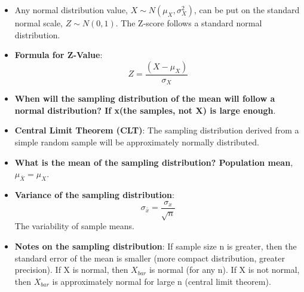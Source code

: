 \documentclass[12pt]{article}
\begin{document}
\begin{itemize}
\item Any normal distribution value, \textbf{$X \sim N(\mu_X , \sigma^2_X)$}, can be put on the standard normal scale, \textbf{$Z \sim N(0, 1)$}. The Z-score follows a standard normal distribution.
\item \textbf{Formula for Z-Value}: $$Z = \frac{(X - \mu_X)}{\sigma_X}$$
\item \textbf{When will the sampling distribution of the mean will follow a normal distribution? If x(the samples, not X) is large enough}.
\item \textbf{Central Limit Theorem (CLT)}: The sampling distribution derived from a simple random sample will be approximately normally distributed.
\item \textbf{What is the mean of the sampling distribution? Population mean}, \textbf{$\mu_{\bar{X}} = \mu_X$}.
\item \textbf{Variance of the sampling distribution}: $$\sigma_{\bar{x}} = \frac{\sigma_x}{\sqrt{n}}$$
The variability of sample means.
\item \textbf{Notes on the sampling distribution}: If sample size n is greater, then the standard error of the mean is smaller (more compact distribution, greater precision). If X is normal, then $X_{bar}$ is normal (for any n). If X is not normal, then $X_{bar}$ is approximately normal for large n (central limit theorem).
\end{itemize}
\end{document}
